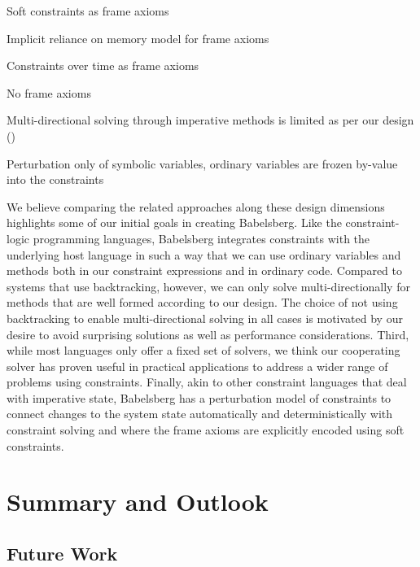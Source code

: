 \begin{table}
\begin{threeparttable}
\begin{tabular}{lllllll}
    \end{tabular}
    \begin{tablenotes}
    \item[1] Soft constraints as frame axioms
    \item[2] Implicit reliance on memory model for frame axioms
    \item[3] Constraints over time as frame axioms
    \item[4] No frame axioms
    \item[5] Multi-directional solving through imperative methods is limited as per our design ()
    \item[6] Perturbation only of symbolic variables, ordinary variables are frozen by-value into the constraints
    \end{tablenotes}
  \end{threeparttable}
\end{table}

\ParSep

We believe comparing the related approaches along these design dimensions
highlights some of our initial goals in creating Babelsberg. Like the
constraint-logic programming languages, Babelsberg integrates constraints with
the underlying host language in such a way that we can use ordinary variables
and methods both in our constraint expressions and in ordinary code. Compared to
systems that use backtracking, however, we can only solve multi-directionally
for methods that are well formed according to our design. The choice of not
using backtracking to enable multi-directional solving in all cases is motivated
by our desire to avoid surprising solutions as well as performance
considerations. Third, while most languages only offer a fixed set of solvers,
we think our cooperating solver has proven useful in practical applications to
address a wider range of problems using constraints. Finally, akin to other
constraint languages that deal with imperative state, Babelsberg has a
perturbation model of constraints to connect changes to the system state
automatically and deterministically with constraint solving and where the frame
axioms are explicitly encoded using soft constraints.

\chapter{Summary and Outlook}

\section{Future Work}
\label{cha:future-work}

